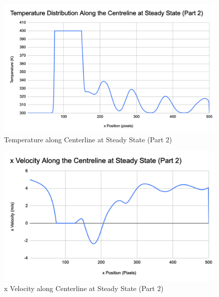 \begin{figure}
\centering
\includegraphics[width=0.7\linewidth]{images/Temp-Part-2.png}
 \caption{Temperature along Centerline at Steady State (Part 2)}
\end{figure}

\begin{figure}
\centering
\includegraphics[width=0.7\linewidth]{images/xVel-Part-2.png}
 \caption{x Velocity along Centerline at Steady State (Part 2)}
\end{figure}











 
\clearpage